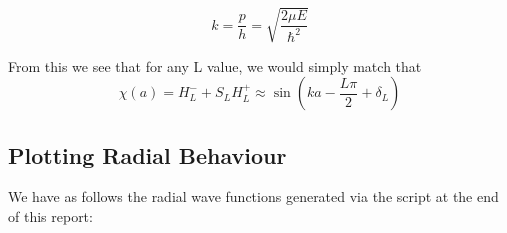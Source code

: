 \documentclass[11pt]{article} %
\begin{document}
\begin{equation}
k=\frac{p}{h}=\sqrt{\frac{2\mu E}{\hbar^2}}
\end{equation}

From this we see that for any L value, we would simply match that\\

\begin{equation}
\chi(a)=H_L^-+S_LH_L^+\approx \sin(ka-\frac{L\pi}{2}+\delta_L)
\end{equation}
\newpage
\subsection{Plotting Radial Behaviour}
We have as follows the radial wave functions generated via the script at the end of this report:\\

\begin{figure}[htbp]
\centering
\begin{floatrow}
\quad

\centering
{}
\end{floatrow}
\end{figure}
\vspace{1mm}
\end{document}
